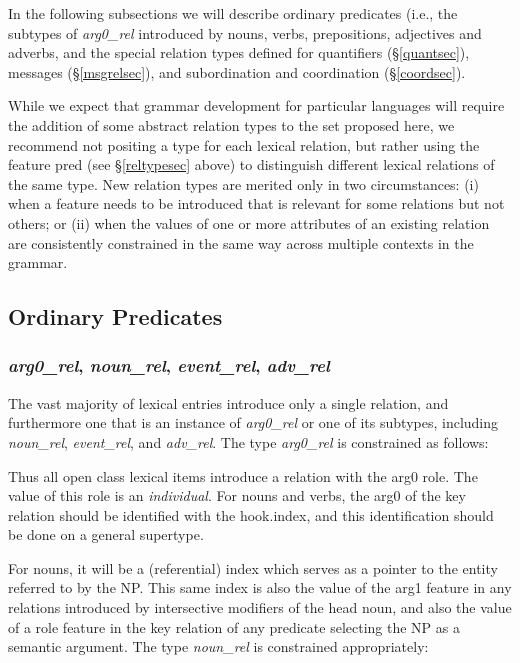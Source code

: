 \documentclass[12pt]{article}
\newcommand{\es}{\enumsentence}
\begin{document}
In the following subsections we will describe
ordinary predicates (i.e., the subtypes of {\it arg0\_rel} introduced by
nouns, verbs, prepositions, adjectives and
adverbs, and the special relation types defined
for quantifiers (\S\ref{quantsec}), messages (\S\ref{msgrelsec}), and
subordination and coordination (\S\ref{coordsec}).

While we expect that grammar development for particular languages will
require the addition of some abstract relation types to the set
proposed here, we recommend not positing a type for each lexical
relation, but rather using the feature {\sc pred} (see
\S\ref{reltypesec} above) to distinguish different lexical relations
of the same type.  New relation types are merited only in two circumstances:
(i) when a feature needs to be introduced that is relevant for some relations
but not others; or (ii) when the values of one or more attributes of an 
existing relation are consistently constrained in the same way across multiple
contexts in the grammar.

\subsection{Ordinary Predicates}
\label{ordpred}

\subsubsection{{\it arg0\_rel}, {\it noun\_rel}, {\it event\_rel}, {\it adv\_rel}}
\label{arg0sec}

The vast majority of lexical entries introduce only a single relation,
and furthermore one that is an instance of {\it arg0\_rel} or one of its
subtypes, including {\it noun\_rel}, {\it event\_rel}, and {\it adv\_rel}.  
The type {\it arg0\_rel} is constrained as follows:

\es{
\begin{avm}
{\it arg0\_rel}: \[ arg0 & individual \]
\end{avm}
}

Thus all open class lexical items introduce a relation with the {\sc
arg0} role.  The value of this role is an {\it individual}.  For nouns
and verbs, the {\sc arg0} of the key relation should be identified with
the {\sc hook.index}, and this identification should be done on a general
supertype.

For nouns, it will be a (referential) index which serves as a pointer
to the entity referred to by the NP.  This
same index is also the value of the {\sc arg1} feature in any relations
introduced by intersective modifiers of the head noun, and also the value of 
a role feature in the key 
relation of any predicate selecting the NP as a semantic argument.  The type
{\it noun\_rel} is constrained appropriately:
\end{document}

